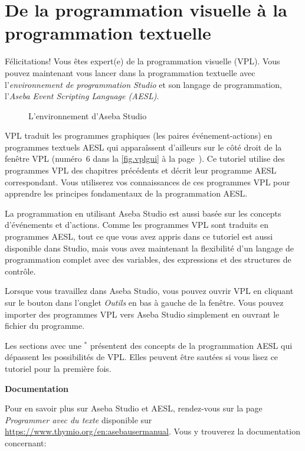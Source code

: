 \part{De la programmation visuelle à la programmation textuelle}
\label{c.next}

Félicitations!
Vous êtes expert(e) de la programmation visuelle (VPL).
Vous pouvez maintenant vous lancer dans la programmation textuelle
avec l'\textit{environnement de programmation Studio} et son langage de
programmation, l'\textit{Aseba Event Scripting Language (AESL)}.


\begin{figure}[hbt]
\begin{center}
\caption{L'environnement d'Aseba Studio}\label{fig.studio}
\end{center}
\end{figure}

VPL traduit les programmes graphiques (les paires événement-actions) en programmes textuels AESL
qui apparaîssent d'ailleurs sur le côté droit de la fenêtre VPL (numéro~6 dans la \cref{fig.vplgui}
à la page~\pageref{fig.vplgui}).
Ce tutoriel utilise des programmes VPL des chapitres précédents et décrit leur programme AESL correspondant.
Vous utiliserez vos connaissances de ces programmes VPL pour apprendre les principes fondamentaux 
de la programmation AESL.

La programmation en utilisant Aseba Studio est aussi basée sur les concepts d'événements et d'actions.
Comme les programmes VPL sont traduits en programmes AESL,
tout ce que vous avez appris dans ce tutoriel est aussi disponible dans Studio,
mais vous avez maintenant la flexibilité d'un langage de programmation complet
avec des variables, des expressions et des structures de contrôle.

Lorsque vous travaillez dans Aseba Studio, vous pouvez ouvrir VPL en cliquant sur le bouton
 dans l'onglet \emph{Outils} en bas à gauche de la fenêtre.
Vous pouvez importer des programmes VPL vers Aseba Studio simplement en ouvrant le fichier du programme.

Les sections avec une $^*$ présentent des concepts de la programmation AESL qui dépassent les 
possibilités de VPL.
Elles peuvent être sautées si vous lisez ce tutoriel pour la première fois.

\newpage

\textbf{\large Documentation}

Pour en savoir plus sur Aseba Studio et AESL, rendez-vous sur la page \emph{Programmer avec du texte}
disponible sur \href{https://www.thymio.org/en:asebausermanual}{https://www.thymio.org/en:asebausermanual}.
Vous y trouverez la documentation concernant:

